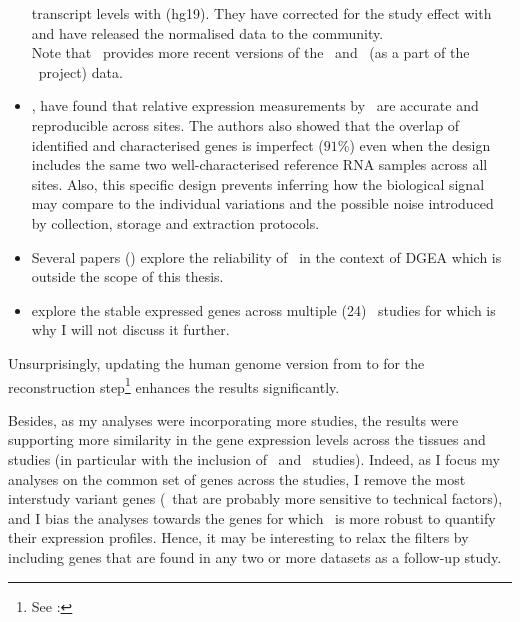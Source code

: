 \begin{itemize}[topsep=0pt,nosep]
transcript levels with  (hg19).
They have corrected for the study effect with 
and have released the normalised data to the community.\\
Note that \egxa\ provides more recent versions of the \gtex\ and \tcga\
(as a part of the \pcawg\ project) data.
\item\hspace{-1mm}, have found that relative expression measurements
by \Rnaseq\ are accurate and reproducible across sites.
The authors also showed that the overlap of identified and characterised genes
is imperfect ($91$\%)
even when the design includes
the same two well-characterised reference RNA samples across all sites.
Also,
this specific design prevents inferring how the biological signal
may compare to the individual variations and the possible noise introduced
by collection, storage and extraction protocols.
\item Several papers (\cite{Khang2015-qt,ruvseqComQN,Rau2014-va})
    explore the reliability of \Rnaseq\ in the context of
    \gls{DGEA} which is outside the scope of this thesis.
\item\cite{Zhuo2016-qi} explore the stable expressed genes across multiple
    (24) \Rnaseq\ studies for \species{Arabidopsis}
    which is why I will not discuss it further.
\end{itemize}

Unsurprisingly,
updating the human genome version from  to 
for the reconstruction
step\footnote{See : }
enhances the results significantly.

Besides, as my analyses were incorporating more studies,
the results were supporting more similarity in the gene expression levels across
the tissues and studies
(in particular with the inclusion of \uhlen\ and \gtex\ studies).
Indeed, as I focus my analyses on the common set of genes across the studies,
I remove the most interstudy variant genes
(\ie\ that are probably more sensitive to technical factors), and
I bias the analyses towards the genes
for which \Rnaseq\ is more robust to quantify their expression profiles.
Hence, it may be interesting to relax the filters by including genes
that are found in any two or more datasets as a follow-up study.

